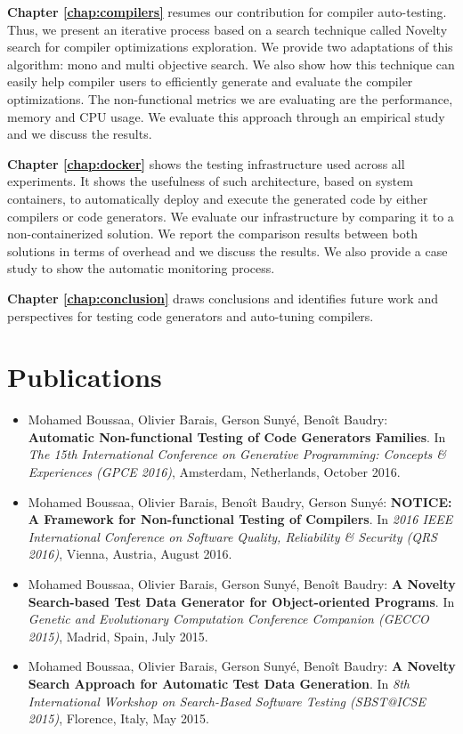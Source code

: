 \textbf{Chapter \ref{chap:compilers}} resumes our contribution for compiler auto-testing. Thus, we present an iterative process based on a search technique called Novelty search for compiler optimizations exploration. We provide two adaptations of this algorithm: mono and multi objective search. We also show how this technique can easily help compiler users to efficiently generate and evaluate the compiler optimizations. The non-functional metrics we are evaluating are the performance, memory and CPU usage. We evaluate this approach through an empirical study and we discuss the results.

\textbf{Chapter \ref{chap:docker}} shows the testing infrastructure used across all experiments. It shows the usefulness of such architecture, based on system containers, to automatically deploy and execute the generated code by either compilers or code generators. 
We evaluate our infrastructure by comparing it to a non-containerized solution. We report the comparison results between both solutions in terms of overhead and we discuss the results. We also provide a case study to show the automatic monitoring process. 

\textbf{Chapter \ref{chap:conclusion}} draws conclusions and identifies future work and perspectives for testing code generators and auto-tuning compilers.

\section{Publications}

\begin{itemize}
	
	\item Mohamed Boussaa, Olivier Barais, Gerson Suny\'e, Beno\^it Baudry:
	\textbf{Automatic Non-functional Testing of Code Generators Families}. In
	\textit{The 15th International Conference on Generative Programming: Concepts \& Experiences (GPCE 2016)},
	Amsterdam, Netherlands, October 2016.

	\item Mohamed Boussaa, Olivier Barais, Beno\^it Baudry, Gerson Suny\'e:
	\textbf{NOTICE: A Framework for Non-functional Testing of Compilers}. In 
	\textit{2016 IEEE International Conference on Software Quality, Reliability \& Security (QRS 2016)}, Vienna, Austria, August 2016.
	
	\item Mohamed Boussaa, Olivier Barais, Gerson Suny\'e, Beno\^it Baudry:
	\textbf{A Novelty Search-based Test Data Generator for Object-oriented Programs}. In 
	\textit{Genetic and Evolutionary Computation Conference Companion (GECCO 2015)}, 
	Madrid, Spain, July 2015.
	
	\item Mohamed Boussaa, Olivier Barais, Gerson Suny\'e, Beno\^it Baudry:
	\textbf{A Novelty Search Approach for Automatic Test Data Generation}. In
	\textit{8th International Workshop on Search-Based Software Testing (SBST@ICSE 2015)}, 
	Florence, Italy, May 2015.

	
	
\end{itemize}



